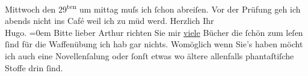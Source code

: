 \begin{ledgroupsized}[t]{13cm}
                        Mittwoch den 29\textsuperscript{ten} um mittag muſs ich ſchon abreiſen.\pend
           \pstart
           Vor der Prüfung geh ich abends nicht ins Café weil ich zu müd werd.\pend
           \pstart
           Herzlich Ihr{\\[\baselineskip]}\spacefill\mbox{Hugo.}\pend
           \leftskip=0em{}\pstart
           \noindent{}Bitte lieber Arthur richten Sie {\pb}mir \uline{viele} Bücher die ſchön zum leſen ſind für die Waffenübung ich
                        hab gar nichts. Womöglich wenn Sie’s haben möcht ich auch eine Novellenſa{\geminationm}lung oder ſonſt etwas wo ältere allenfalls
                        phantaſtiſche Stoffe drin ſind.\pend
           
         
         \endnumbering{}\end{ledgroupsized}  \newcommand{\dateiname}{L00808}\newcommand{\titel}{Hugo von Hofmannsthal an Arthur Schnitzler, [21. 6. 1898]}\newcommand{\editorInnen}{Martin Anton Müller und Gerd-Hermann Susen}
      